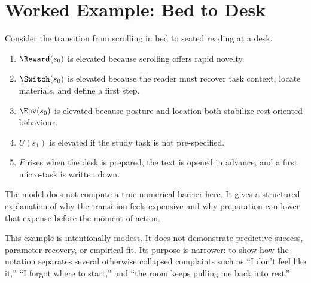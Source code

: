 \section{Worked Example: Bed to Desk}

\begin{example}
Consider the transition from scrolling in bed to seated reading at a desk.
\begin{enumerate}[nosep]
  \item $\Reward(s_0)$ is elevated because scrolling offers rapid novelty.
  \item $\Switch(s_0)$ is elevated because the reader must recover task
        context, locate materials, and define a first step.
  \item $\Env(s_0)$ is elevated because posture and location both stabilize
        rest-oriented behaviour.
  \item $U(s_1)$ is elevated if the study task is not pre-specified.
  \item $P$ rises when the desk is prepared, the text is opened in advance, and
        a first micro-task is written down.
\end{enumerate}
The model does not compute a true numerical barrier here. It gives a structured
explanation of why the transition feels expensive and why preparation can lower
that expense before the moment of action.
\end{example}

\begin{discussion}
This example is intentionally modest. It does not demonstrate predictive
success, parameter recovery, or empirical fit. Its purpose is narrower: to show
how the notation separates several otherwise collapsed complaints such as ``I
don't feel like it,'' ``I forgot where to start,'' and ``the room keeps pulling
me back into rest.''
\end{discussion}

